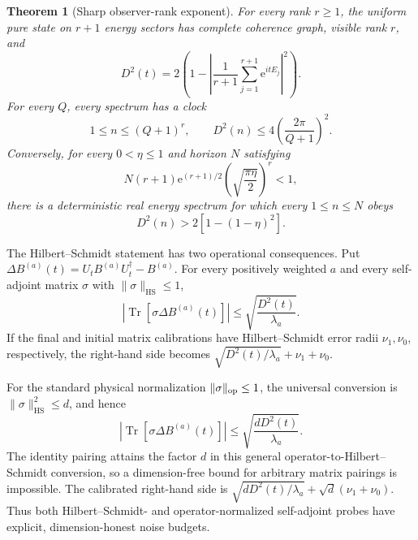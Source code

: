 \documentclass[10pt]{article}
\newtheorem{theorem}{Theorem}
\theoremstyle{definition}
\newcommand{\HS}{\mathrm{HS}}
\newcommand{\ee}{\mathrm e}
\begin{document}
\begin{theorem}[Sharp observer-rank exponent]
\label{thm:graph-sharp}
For every rank \(r\geq1\), the uniform pure state on \(r+1\) energy sectors
has complete coherence graph, visible rank \(r\), and
\begin{equation}
 D^2(t)=2\left(1-\left|
   \frac{1}{r+1}\sum_{j=1}^{r+1}\ee^{itE_j}\right|^2\right).
\label{eq:uniform-distance}
\end{equation}
For every \(Q\), every spectrum has a clock
\begin{equation}
 1\leq n\leq(Q+1)^r,\qquad
 D^2(n)\leq4\left(\frac{2\pi}{Q+1}\right)^2.
\label{eq:rank-upper}
\end{equation}
Conversely, for every \(0<\eta\leq1\) and horizon \(N\) satisfying
\begin{equation}
 N(r+1)\ee^{(r+1)/2}
 \left(\sqrt{\frac{\pi\eta}{2}}\right)^r<1,
\label{eq:rank-hard-budget}
\end{equation}
there is a deterministic real energy spectrum for which every
\(1\leq n\leq N\) obeys
\begin{equation}
 D^2(n)>2\left[1-(1-\eta)^2\right].
\label{eq:rank-lower}
\end{equation}
\end{theorem}

The Hilbert--Schmidt statement has two operational consequences.  Put
\(\Delta B^{(a)}(t)=U_tB^{(a)}U_t^\dagger-B^{(a)}\).  For every positively
weighted \(a\) and every self-adjoint matrix \(\sigma\) with
\(\|\sigma\|_{\HS}\leq1\),
\begin{equation}
 \left|\operatorname{Tr}\!\left[\sigma\Delta B^{(a)}(t)\right]\right|
 \leq\sqrt{\frac{D^2(t)}{\lambda_a}}.
\label{eq:operational}
\end{equation}
If the final and initial matrix calibrations have Hilbert--Schmidt error
radii \(\nu_1,\nu_0\), respectively, the right-hand side becomes
\(\sqrt{D^2(t)/\lambda_a}+\nu_1+\nu_0\).

For the standard physical normalization \(\|\sigma\|_{\rm op}\leq1\), the
universal conversion is \(\|\sigma\|_{\HS}^2\leq d\), and hence
\begin{equation}
 \left|\operatorname{Tr}\!\left[\sigma\Delta B^{(a)}(t)\right]\right|
 \leq\sqrt{\frac{dD^2(t)}{\lambda_a}}.
\label{eq:operator-operational}
\end{equation}
The identity pairing attains the factor \(d\) in this general
operator-to-Hilbert--Schmidt conversion, so a dimension-free bound for
arbitrary matrix pairings is impossible.
The calibrated right-hand side is
\(\sqrt{dD^2(t)/\lambda_a}+\sqrt d(\nu_1+\nu_0)\).
Thus both Hilbert--Schmidt- and operator-normalized self-adjoint probes have
explicit, dimension-honest noise budgets.
\end{document}
